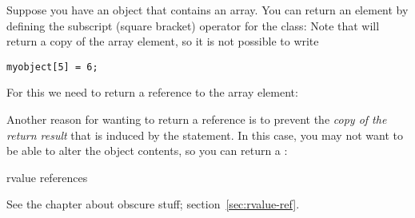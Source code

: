 Suppose you have an object that contains an  array. You can
return an element by defining the subscript (square bracket) operator
for the class:
%
%
Note that  will return a copy of the array element,
so it is not possible to write
\begin{verbatim}
myobject[5] = 6;
\end{verbatim}
For this we need to return a reference to the array element:
%

Another reason for wanting to return a reference is to prevent the
\emph{copy of the return result}
that is induced by the  statement.
In this case, you may not want to be able to alter the object
contents, so you can return a :
%

 {rvalue references}

See the chapter about obscure stuff; section~\ref{sec:rvalue-ref}.
